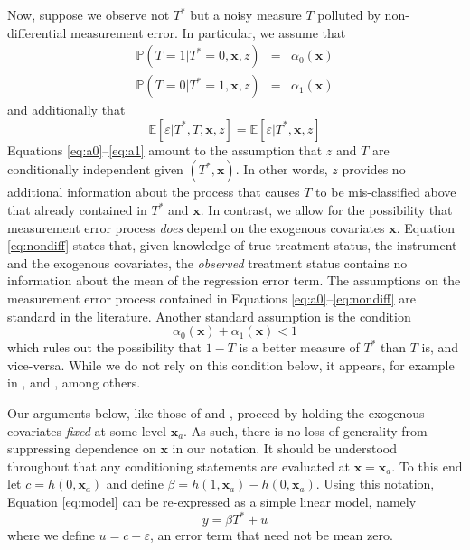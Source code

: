 Now, suppose we observe not $T^*$ but a noisy measure $T$ polluted by non-differential measurement error.
In particular, we assume that
\begin{eqnarray}
  \label{eq:a0}
  \mathbb{P}(T = 1| T^* = 0, \mathbf{x}, z)  &=&  \alpha_0(\mathbf{x})\\
  \label{eq:a1}
  \mathbb{P}(T = 0| T^* = 1, \mathbf{x}, z)  &=&  \alpha_1(\mathbf{x})
\end{eqnarray}
and additionally that
\begin{equation}
  \mathbb{E}[\varepsilon|T^*,T,\mathbf{x},z] =  \mathbb{E}[\varepsilon|T^*,\mathbf{x},z]
  \label{eq:nondiff}
\end{equation}
Equations \ref{eq:a0}--\ref{eq:a1} amount to the assumption that $z$ and $T$ are conditionally independent given $(T^*,\mathbf{x})$. 
In other words, $z$ provides no additional information about the process that causes $T$ to be mis-classified above that already contained in $T^*$ and $\mathbf{x}$.
In contrast, we allow for the possibility that measurement error process \emph{does} depend on the exogenous covariates $\mathbf{x}$. 
Equation \ref{eq:nondiff} states that, given knowledge of true treatment status, the instrument and the exogenous covariates, the \emph{observed} treatment status contains no information about the mean of the regression error term.  
The assumptions on the measurement error process contained in Equations \ref{eq:a0}--\ref{eq:nondiff} are standard in the literature.
Another standard assumption is the condition
\begin{equation}
  \alpha_0(\mathbf{x}) + \alpha_1(\mathbf{x}) < 1
  \label{eq:alphaIneq}
\end{equation}
which rules out the possibility that $1-T$ is a better measure of $T^*$ than $T$ is, and vice-versa.
While we do not rely on this condition below, it appears, for example in \cite{Mahajan}, and \cite{Lewbel}, among others.

Our arguments below, like those of \cite{Mahajan} and \cite{Lewbel}, proceed by holding the exogenous covariates \emph{fixed} at some level $\mathbf{x}_a$.
As such, there is no loss of generality from suppressing dependence on $\mathbf{x}$ in our notation. 
It should be understood throughout that any conditioning statements are evaluated at $\mathbf{x}=\mathbf{x}_a$.
To this end let $c = h(0,\mathbf{x}_a)$ and define $\beta = h(1,\mathbf{x}_a) - h(0,\mathbf{x}_a)$.
Using this notation, Equation \ref{eq:model} can be re-expressed as a simple linear model, namely 
\begin{equation}
  y = \beta T^* + u 
  \label{eq:linear}
\end{equation}
where we define $u = c + \varepsilon$, an error term that need not be mean zero.

